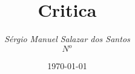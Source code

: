 \begin{titlepage}
\centering
\title{Critica}
\author{\emph{S\'{e}rgio Manuel Salazar dos Santos}\\ \;$N^o$}
\date{\today}
\maketitle
\end{titlepage}